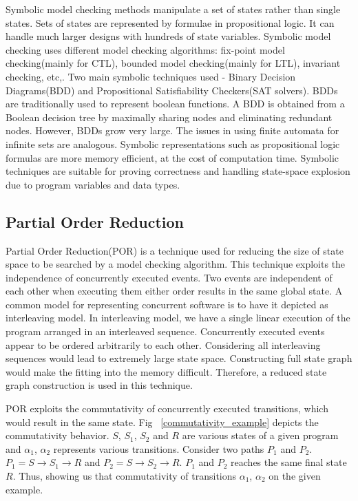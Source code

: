 Symbolic model checking methods manipulate a set of states rather than single states. 
Sets of states are represented by formulae in propositional logic. 
It can handle much larger designs with hundreds of state variables. 
Symbolic model checking uses different model checking algorithms: fix-point model checking(mainly for CTL), bounded model checking(mainly for LTL), invariant checking, etc,. 
Two main symbolic techniques used - Binary Decision Diagrams(BDD) and Propositional Satisfiability Checkers(SAT solvers). 
BDDs are traditionally used to represent boolean functions. 
A BDD is obtained from a Boolean decision tree by maximally sharing nodes and eliminating redundant nodes. 
However, BDDs grow very large. 
The issues in using finite automata for infinite sets are analogous. 
Symbolic representations such as propositional logic formulas are more memory efficient, at the cost of computation time. 
Symbolic techniques are suitable for proving correctness and handling state-space explosion due to program variables and data types.


\subsection{Partial Order Reduction}

Partial Order Reduction(POR) is a technique used for reducing the size of state space to be searched by a model checking algorithm\cite{por10yrs}. 
This technique exploits the independence of concurrently executed events. 
Two events are independent of each other when executing them either order results in the same global state\cite{model_check}. 
A common model for representing concurrent software is to have it depicted as interleaving model. 
In interleaving model, we have a single linear execution of the program arranged in an interleaved sequence. 
Concurrently executed events appear to be ordered arbitrarily to each other. 
Considering all interleaving sequences would lead to extremely large state space. 
Constructing full state graph would make the fitting into the memory difficult. 
Therefore, a reduced state graph construction is used in this technique. 
 
POR exploits the commutativity of concurrently executed transitions, which would result in the same state. 
Fig ~\ref{commutativity_example} depicts the commutativity behavior. 
$S$, $S_1$, $S_2$ and $R$ are various states of a given program and $\alpha_1$, $\alpha_2$ represents various transitions. 
Consider two paths $P_1$ and $P_2$. 
$P_1 = S \rightarrow S_1 \rightarrow  R$ and $P_2 = S \rightarrow S_2 \rightarrow  R$. 
$P_1$ and $P_2$ reaches the same final state $R$. 
Thus, showing us that commutativity of transitions $\alpha_1$, $\alpha_2$ on the given example. 





